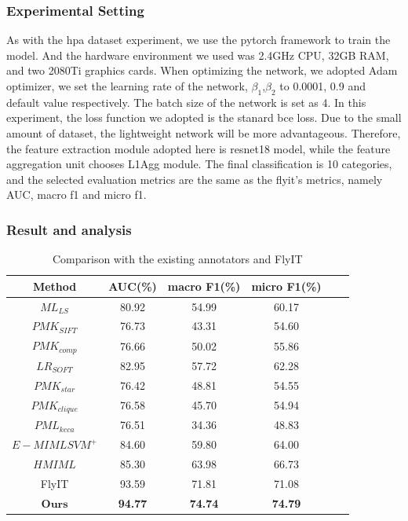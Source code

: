 \documentclass[10pt,twocolumn,letterpaper]{article}
\begin{document}
\subsubsection{Experimental Setting}
As with the hpa dataset experiment, we use the pytorch framework to train the model. And the hardware environment we used was 2.4GHz CPU, 32GB RAM, and two 2080Ti graphics cards. When optimizing the network, we adopted Adam optimizer\cite{ref25}, we set the learning rate of the network, $\beta_1$,$\beta_2$ to 0.0001, 0.9 and default value respectively. The batch size of the network is set as 4. In this experiment, the loss function we adopted is the stanard bce loss. Due to the small amount of dataset, the lightweight network will be more advantageous. Therefore, the feature extraction module adopted here is resnet18 model, while the feature aggregation unit chooses L1Agg module. The final classification is 10 categories, and the selected evaluation metrics are the same as the flyit's\cite{ref27} metrics, namely AUC, macro f1 and micro f1.

\subsubsection{Result and analysis}

\begin{table}
\footnotesize
\begin{center}
\begin{tabular}{|c|c|c|c|c|c|}
\hline
Method & AUC(\%) & macro F1(\%)  & micro F1(\%)\\
\hline\hline
$ML_{LS}$ & 80.92 & 54.99 & 60.17 \\
$PMK_{SIFT}$ & 76.73 & 43.31 & 54.60 \\
$PMK_{comp}$ & 76.66 & 50.02 & 55.86 \\
$LR_{SOFT}$ & 82.95 & 57.72 & 62.28 \\
$PMK_{star}$ & 76.42 & 48.81 & 54.55 \\

$PMK_{clique}$ & 76.58 & 45.70 & 54.94 \\
$PML_{kcca}$ & 76.51 & 34.36 & 48.83 \\
$E-MIMLSVM^{+}$ & 84.60 & 59.80 & 64.00 \\
$HMIML$ & 85.30 & 63.98 & 66.73 \\
FlyIT & 93.59 & 71.81 & 71.08 \\ \hline 
$\textbf{Ours}$ & \textbf{94.77} & \textbf{74.74} & \textbf{74.79} \\
\hline
\end{tabular}
\end{center}
\caption{Comparison with the existing annotators and FlyIT}
\end{table}
\end{document}
